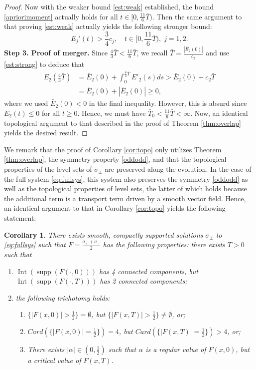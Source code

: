 \documentclass[11pt,reqno]{amsproc}
\newtheorem{cor}{Corollary}
\DeclareMathOperator{\supp}{supp}
\DeclareMathOperator{\Int}{Int}
\begin{document}
\begin{proof}
    Now with the weaker bound \eqref{est:weak} established, the bound \eqref{apriorimoment} actually holds for all $t \in [0,\frac{11}{6}\bar T)$. Then the same argument to that proving \eqref{est:weak} actually yields the following stronger bound:
    \begin{equation}
        \label{est:strong}
        E_j'(t) > \frac34 c_j, \quad t \in[0,\frac{11}{6}\bar T),\; j = 1,2.
    \end{equation}
    \noindent\textbf{Step 3. Proof of merger.}
    Since $\frac{4}{3} \bar T < \frac{11}{6} \bar T$, we recall $\bar T = \frac{|\bar E_2(0)|}{c_2}$ and use \eqref{est:strong} to deduce that
    \begin{align*}
        E_2(\frac{4}{3} \bar T) &= \bar E_2(0) + \int_0^{\frac{4}{3} \bar T} E'_2(s) ds > \bar E_2(0) +  c_2 \bar T\\
        & = \bar E_2(0) + |\bar E_2(0)| \ge 0,
    \end{align*}
    where we used $\bar E_2(0) < 0$ in the final inequality. However, this is absurd since $E_2(t) \le 0$ for all $t \ge 0$. Hence, we must have $\bar T_0 < \frac{11}{6} \bar T < \infty$. Now, an identical topological argument to that described in the proof of Theorem \ref{thm:overlap} yields the desired result.
\end{proof}

We remark that the proof of Corollary \ref{cor:topo} only utilizes Theorem \ref{thm:overlap}, the symmetry property \eqref{oddodd}, and that the topological properties of the level sets of $\sigma_\pm$ are preserved along the evolution. In the case of the full system \ref{eq:fullsys}, this system also preserves the symmetry \eqref{oddodd} as well as the topological properties of level sets, the latter of which holds because the additional term is a transport term driven by a smooth vector field. Hence, an identical argument to that in Corollary \ref{cor:topo} yields the following statement:
\begin{cor}\label{cor:topofull}
    There exists smooth, compactly supported solutions $\sigma_\pm$ to \eqref{eq:fullsys} such that $F = \frac{\sigma_+ + \sigma_-}{2}$ has the following properties: there exists $T > 0$ such that
    \begin{enumerate}
        \item $\Int(\supp(F(\cdot,0)))$ has 4 connected components, but $\Int(\supp(F(\cdot,T)))$ has 2 connected components;
        \item the following trichotomy holds:
        \begin{enumerate}
            \item $\{|F(x,0)| > \frac12\} = \emptyset$, but $\{|F(x,T)| > \frac12\} \neq \emptyset$, or;
            \item $Card(\{|F(x,0)| = \frac12\}) = 4$, but $Card(\{|F(x,T)| = \frac12\}) > 4$, or;
            \item There exists $|\alpha| \in (0,\frac12)$ such that $\alpha$ is a regular value of $F(x,0)$, but a critical value of $F(x,T)$.
        \end{enumerate}
    \end{enumerate}
\end{cor}
\end{document}
